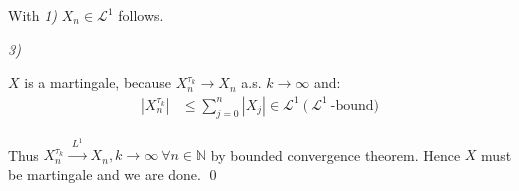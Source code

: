 \documentclass[12pt]{article}
\begin{document}
With \emph{1)} $X_n \in \mathscr{L}^1$ follows.

\emph{3)} 

$X$ is a martingale, because $X_n^{\tau_k} \to X_n$ a.s. $k \to \infty$ and:
\begin{align*}
|X_n^{\tau_k}| &\leq \sum_{j=0}^n |X_j| \in \mathscr{L}^1 \ \text{(} \ \mathscr{L}^1 \ \text{-bound)}
\end{align*}

Thus $X_n^{\tau_k} \stackrel{\substack{L^1}}{\longrightarrow} X_n, k \to \infty \ \forall n \in \mathbb{N}$ by bounded convergence theorem. 
Hence $X$ must be martingale and we are done. \qed


\end{document}

